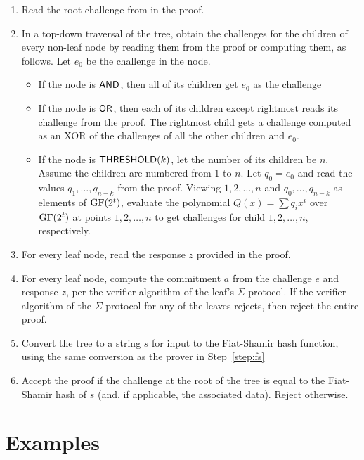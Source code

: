 \documentclass[11pt]{llncs}
\begin{document}
\begin{enumerate}
\item Read the root challenge from in the proof. 

\item In a top-down traversal of the tree, obtain the challenges for the children of every non-leaf node by reading them from the proof or computing them, as follows. Let $e_0$ be the challenge in the node. 
        \begin{itemize}
            \item If the node is $\mathsf{AND}$,  then all of its children get $e_0$ as the challenge
            \item If the node is $\mathsf{OR}$, then each of its children except rightmost reads its challenge from the proof. The rightmost child gets a challenge computed as an XOR of the challenges of all the other children and $e_0$.
            \item If the node is $\mathsf{THRESHOLD}(k)$, let the number of its children be $n$. Assume the children are numbered from $1$ to $n$. Let $q_0=e_0$ and read the values $q_1, \dots, q_{n-k}$ from the proof. Viewing $1, 2, \dots, n$ and $q_0, \dots, q_{n-k}$ as elements of $\mathrm{GF}(2^t)$, evaluate the polynomial $Q(x) = \sum {q_i x^i}$ over $\mathrm{GF}(2^t)$ at points $1, 2, \dots, n$ to get challenges for child $1, 2, \dots, n$, respectively. 
        \end{itemize}
        
 \item For every leaf node, read the response $z$ provided in the proof.

\item For every leaf node, compute the commitment $a$ from the challenge $e$ and response $z$, per the verifier algorithm of the leaf's $\Sigma$-protocol. If the verifier algorithm of the $\Sigma$-protocol for any of the leaves rejects, then reject the entire proof.

\item Convert the tree to a string $s$ for input to the Fiat-Shamir hash function, using the same conversion as the prover in Step~\ref{step:fs}

\item Accept the proof if the challenge at the root of the tree is equal to the Fiat-Shamir hash of $s$ (and, if applicable,  the associated data). Reject otherwise.
\end{enumerate}

\section{Examples}
\end{document}
